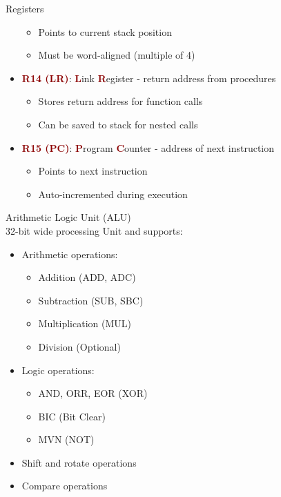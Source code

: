 \begin{definition}{Registers}
\begin{itemize}
    \begin{itemize}
      \item Points to current stack position
      \item Must be word-aligned (multiple of 4)
    \end{itemize}
  \item \textcolor{darkred}{\textbf{R14 (LR)}}: \textcolor{darkred}{\textbf{L}}ink \textcolor{darkred}{\textbf{R}}egister - return address from procedures
    \begin{itemize}
      \item Stores return address for function calls
      \item Can be saved to stack for nested calls
    \end{itemize}
  \item \textcolor{darkred}{\textbf{R15 (PC)}}: \textcolor{darkred}{\textbf{P}}rogram \textcolor{darkred}{\textbf{C}}ounter - address of next instruction
    \begin{itemize}
      \item Points to next instruction
      \item Auto-incremented during execution
    \end{itemize}
\end{itemize}
\end{definition}

\begin{definition}{Arithmetic Logic Unit (ALU)}\\
32-bit wide processing Unit and supports:
\begin{itemize}
  \item Arithmetic operations:
    \begin{itemize}
      \item Addition (ADD, ADC)
      \item Subtraction (SUB, SBC)
      \item Multiplication (MUL)
      \item Division (Optional)
    \end{itemize}
  \item Logic operations:
    \begin{itemize}
      \item AND, ORR, EOR (XOR)
      \item BIC (Bit Clear)
      \item MVN (NOT)
    \end{itemize}
  \item Shift and rotate operations
  \item Compare operations
\end{itemize}
\end{definition}

